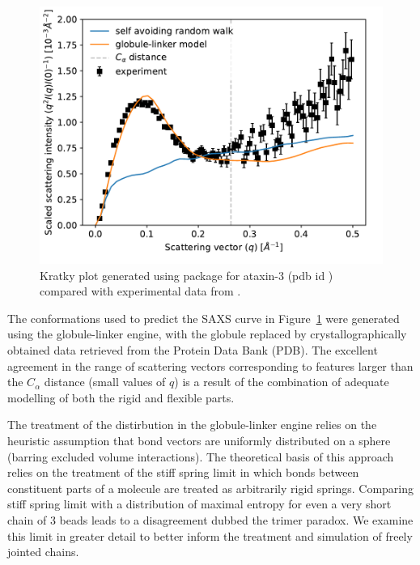 \documentclass{doctoral}
\newcommand{\code}[1]{\texttt{\detokenize{#1}}}
\begin{document}
\begin{figure}[htbp]
    \centering
    \includegraphics[height=0.5\linewidth]{figures/saxs_single_bead.pdf}
    \caption{Kratky plot generated using \code{saxs_single_bead} package for {ataxin-3} (pdb id \code{1yzb}) compared with experimental data from \textcite{Sicorello_2021}.}
    \label{fig:saxs_compare}
\end{figure}

The conformations used to predict the SAXS curve in Figure~\ref{fig:saxs_compare} were generated using the globule-linker engine, with the globule replaced by crystallographically obtained data retrieved from the Protein Data Bank (PDB)\cite{rcsb_org}.
The excellent agreement in the range of scattering vectors corresponding to features larger than the $C_{\alpha}$ distance (small values of $q$) is a result of the combination of adequate modelling of both the rigid and flexible parts.

The treatment of the distirbution in the globule-linker engine relies on the heuristic assumption that bond vectors are uniformly distributed on a sphere (barring excluded volume interactions).
The theoretical basis of this approach relies on the treatment of the stiff spring limit in which bonds between constituent parts of a molecule are treated as arbitrarily rigid springs.
Comparing stiff spring limit with a distribution of maximal entropy for even a very short chain of 3 beads leads to a disagreement dubbed the trimer paradox.
We examine this limit in greater detail to better inform the treatment and simulation of freely jointed chains.
\clearpage
\end{document}
